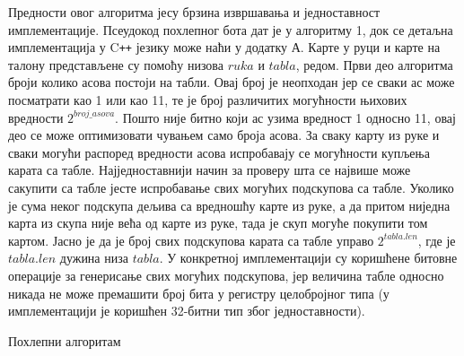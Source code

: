 \documentclass[a4paper, 12pt, ngerman]{article}
\newcommand{\cpp}{C\texttt{++} }
\begin{document}
Предности овог алгоритма јесу брзина извршавања и једноставност имплементације. Псеудокод похлепног бота дат је у алгоритму 1, док се детаљна имплементација у \cpp језику може наћи у додатку А. Карте у руци и карте на талону представљене су помоћу низова $ruka$ и $tabla$, редом. Први део алгоритма броји колико асова постоји на табли. Овај број је неопходан јер се сваки ас може посматрати као 1 или као 11, те је број различитих могућности њихових вредности $2^{broj\_asova}$. Пошто није битно који ас узима вредност 1 односно 11, овај део се може оптимизовати чувањем само броја асова. За сваку карту из руке и сваки могући распоред вредности асова испробавају се могућности купљења карата са табле. Најједноставнији начин за проверу шта се највише може сакупити са табле јесте испробавање свих могућих подскупова са табле. Уколико је сума неког подскупа дељива са вредношћу карте из руке, а да притом ниједна карта из скупа није већа од карте из руке, тада је скуп могуће покупити том картом. Јасно је да је број свих подскупова карата са табле управо $2^{tabla.len}$, где је $tabla.len$ дужина низа $tabla$. У конкретној имплементацији су коришћене битовне операције за генерисање свих могућих подскупова, јер величина табле односно никада не може премашити број бита у регистру целобројног типа (у имплементацији је коришћен 32-битни тип због једноставности).

\begin{algorithm}[htbp]
\caption{Похлепни алгоритам}
\label{alg:greedy}
\end{algorithm}
\end{document}
